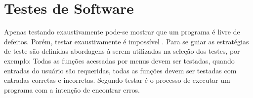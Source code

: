\section{Testes de Software}

Apenas testando exaustivamente pode-se mostrar que um programa é livre de defeitos. Porém, testar exaustivamente é impossível . Para se guiar as estratégias de teste são definidas abordagens à serem utilizadas na seleção dos testes, por exemplo: Todas as funções acessadas por menus devem ser testadas, quando entradas do usuário são requeridas, todas as funções devem ser testadas com entradas corretas e incorretas. Segundo  testar é o processo de executar um programa com a intenção de encontrar erros.

